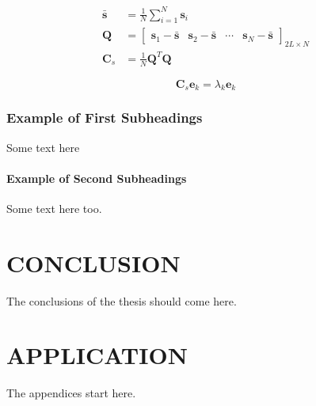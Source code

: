 \documentclass[a4paper,onesided,12pt]{report}
\begin{document}
\begin{align} 
\mathbf{\bar{s}} & =\frac{1}{N} \sum_{i=1}^N \mathbf{s}_i
\label{eq:mean}   
\\
\mathbf{Q} & =\left[ 
\begin{array}{cccc} 
 \mathbf{s}_1  - \mathbf{\bar{s}} & \mathbf{s}_2 - \mathbf{\bar{s}} &
\cdots & \mathbf{s}_N  - \mathbf{\bar{s}}
\end{array}
\right]_{2L\times N }
\label{eq:q}
\\ 
\mathbf{C}_s & =\frac{1}{N} \mathbf{Q}^T \mathbf{Q}
\label{eq:cov_matrix}
\end{align}

\begin{equation}
    \mathbf{C}_s \mathbf{e}_k = \lambda_k \mathbf{e}_k
    \label{eq:pca}
\end{equation}

\subsection{Example of First Subheadings}
Some text here
\subsubsection{Example of Second Subheadings}
Some text here too.
\chapter{CONCLUSION}
\label{chapter:conclusion}

The conclusions of the thesis should come
here.




\appendix
\chapter{APPLICATION}
The appendices start here.
\end{document}
